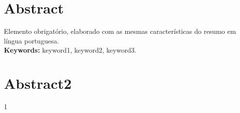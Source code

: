 \documentclass[11pt,twoside,a4paper]{book}
\begin{document}



\chapter*{Abstract}

Elemento obrigatório, elaborado com as mesmas características do resumo em
língua portuguesa.
\\

\noindent \textbf{Keywords:} keyword1, keyword2, keyword3.

\chapter*{Abstract2}

1
\pagebreak

\tableofcontents    %




\end{document}
